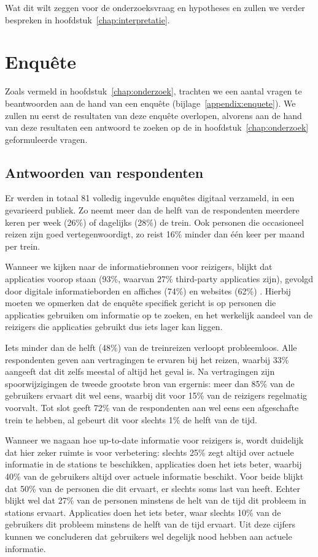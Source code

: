 Wat dit wilt zeggen voor de onderzoeksvraag en hypotheses en zullen we verder bespreken in hoofdstuk~\ref{chap:interpretatie}.

\section{Enquête}
Zoals vermeld in hoofdstuk~\ref{chap:onderzoek}, trachten we een aantal vragen te beantwoorden aan de hand van een enquête (bijlage~\ref{appendix:enquete}). We zullen nu eerst de resultaten van deze enquête overlopen, alvorens aan de hand van deze resultaten een antwoord te zoeken op de in hoofdstuk~\ref{chap:onderzoek} geformuleerde vragen.

\subsection{Antwoorden van respondenten}
Er werden in totaal 81 volledig ingevulde enquêtes digitaal verzameld, in een gevarieerd publiek. Zo neemt meer dan de helft van de respondenten meerdere keren per week (26\%) of dagelijks (28\%) de trein. Ook personen die occasioneel reizen zijn goed vertegenwoordigt, zo reist 16\% minder dan één keer per maand per trein.

Wanneer we kijken naar de informatiebronnen voor reizigers, blijkt dat  applicaties voorop staan (93\%, waarvan 27\% third-party applicaties zijn), gevolgd door digitale informatieborden en affiches (74\%) en websites (62\%) . Hierbij moeten we opmerken dat de enquête specifiek gericht is op personen die applicaties gebruiken om informatie op te zoeken, en het werkelijk aandeel van de reizigers die applicaties gebruikt dus iets lager kan liggen.

Iets minder dan de helft (48\%) van de treinreizen verloopt probleemloos. Alle respondenten geven aan vertragingen te ervaren bij het reizen, waarbij 33\% aangeeft dat dit zelfs meestal of altijd het geval is. Na vertragingen zijn spoorwijzigingen de tweede grootste bron van ergernis: meer dan 85\% van de gebruikers ervaart dit wel eens, waarbij dit voor 15\% van de reizigers regelmatig voorvalt. Tot slot geeft 72\% van de respondenten aan wel eens een afgeschafte trein te hebben, al gebeurt dit voor slechts 1\% de helft van de tijd.

Wanneer we nagaan hoe up-to-date informatie voor reizigers is, wordt duidelijk dat hier zeker ruimte is voor verbetering: slechts 25\% zegt altijd over actuele informatie in de stations te beschikken, applicaties doen het iets beter, waarbij 40\% van de gebruikers altijd over actuele informatie beschikt. Voor beide blijkt dat 50\% van de personen die dit ervaart, er slechts soms last van heeft. Echter blijkt wel dat 27\% van de personen minstens de helt van de tijd dit probleem in stations ervaart. Applicaties doen het iets beter, waar slechts 10\% van de gebruikers dit probleem minstens de helft van de tijd ervaart. Uit deze cijfers kunnen we concluderen dat gebruikers wel degelijk nood hebben aan actuele informatie. 

